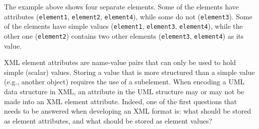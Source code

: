 \documentclass[10pt]{article}
\begin{document}
The example above shows four separate elements.  Some of the elements have
attributes (\texttt{element1}, \texttt{element2}, \texttt{element4}), while
some do not (\texttt{element3}).  Some of the elements have simple values
(\texttt{element1}, \texttt{element3}, \texttt{element4}), while the other
one (\texttt{element2}) contains two other elements (\texttt{element3},
\texttt{element4}) as its value.

XML element attributes are name-value pairs that can only be used to hold
simple (scalar) values.  Storing a value that is more structured than a
simple value (e.g., another object) requires the use of a subelement.  When
encoding a UML data structure in XML, an attribute in the UML structure may
or may not be made into an XML element attribute.  Indeed, one of the first
questions that needs to be answered when developing an XML format is: what
should be stored as element attributes, and what should be stored as
element values?
\end{document}
